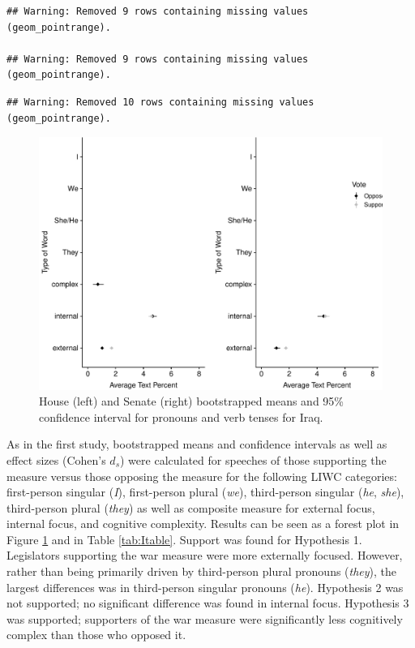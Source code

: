 \documentclass[english,,man]{apa6}
\begin{document}
\begin{verbatim}
## Warning: Removed 9 rows containing missing values (geom_pointrange).

## Warning: Removed 9 rows containing missing values (geom_pointrange).
\end{verbatim}

\begin{verbatim}
## Warning: Removed 10 rows containing missing values (geom_pointrange).
\end{verbatim}

\begin{figure}
\centering
\includegraphics{Language_of_War_Markdown_KJ2_files/figure-latex/Ipic-1.pdf}
\caption{\label{fig:Ipic}House (left) and Senate (right) bootstrapped means and 95\% confidence interval for pronouns and verb tenses for Iraq.}
\end{figure}

As in the first study, bootstrapped means and confidence intervals as well as effect sizes (Cohen's \(d_s\)) were calculated for speeches of those supporting the measure versus those opposing the measure for the following LIWC categories: first-person singular (\emph{I}), first-person plural (\emph{we}), third-person singular (\emph{he}, \emph{she}), third-person plural (\emph{they}) as well as composite measure for external focus, internal focus, and cognitive complexity. Results can be seen as a forest plot in Figure \ref{fig:Ipic} and in Table \ref{tab:Itable}. Support was found for Hypothesis 1. Legislators supporting the war measure were more externally focused. However, rather than being primarily driven by third-person plural pronouns (\emph{they}), the largest differences was in third-person singular pronouns (\emph{he}). Hypothesis 2 was not supported; no significant difference was found in internal focus. Hypothesis 3 was supported; supporters of the war measure were significantly less cognitively complex than those who opposed it.
\end{document}
